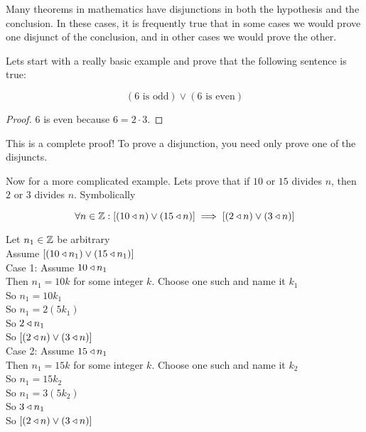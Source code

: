 Many theorems in mathematics have disjunctions in both the hypothesis and the conclusion.  In these cases, it is frequently true that in some cases we would prove one disjunct of the conclusion, and in other cases we would prove the other.

\begin{example}
	Lets start with a really basic example and prove that the following sentence is true:
	
	\[
	(\textrm{$6$ is odd}) \vee (\textrm{$6$ is even})
	\]
	
	\begin{proof}
$6$ is even because $6 = 2 \cdot 3$. 
	\end{proof}
	
	This is a complete proof!  To prove a disjunction, you need only prove one of the disjuncts.
	\end{example}

\begin{example}
		Now for a more complicated example.  Lets prove that if $10$ or $15$ divides $n$, then $2$ or $3$ divides $n$. Symbolically 
		
		\[
		\forall n \in \mathbb{Z}: [(10 \triangleleft n) \vee (15 \triangleleft n)] \implies [(2 \triangleleft n) \vee (3 \triangleleft n)]
		\]
		
		\begin{fitch}
				\textrm{Let $n_1 \in \mathbb{Z}$ be arbitrary}\\
				\textrm{Assume  $[(10 \triangleleft n_1) \vee (15 \triangleleft n_1)]$}\\
				\fa \textrm{Case 1:  Assume $10 \triangleleft n_1$}\\
				\fa \fa \textrm{Then $n_1 = 10k$ for some integer $k$.  Choose one such and name it $k_1$}\\
				\fa \fa \textrm{So $n_1 = 10k_1$}\\
				\fa \fa \textrm{So $n_1 = 2(5k_1)$}\\
				\fa \fa \textrm{So $2 \triangleleft n_1$}\\
				\fa \fa \textrm{So $[(2 \triangleleft n) \vee (3 \triangleleft n)]$}\\
				\fa \textrm{Case 2:  Assume $15 \triangleleft n_1$}\\
				\fa \fa \textrm{Then $n_1 = 15k$ for some integer $k$.  Choose one such and name it $k_2$}\\
				\fa \fa \textrm{So $n_1 = 15k_2$}\\
				\fa \fa \textrm{So $n_1 = 3(5k_2)$}\\
				\fa \fa \textrm{So $3 \triangleleft n_1$}\\
				\fa \fa \textrm{So $[(2 \triangleleft n) \vee (3 \triangleleft n)]$}\\
			\end{fitch}
	\end{example}

